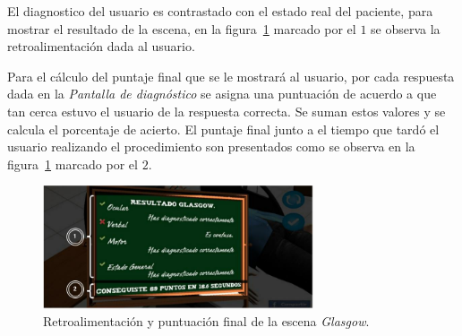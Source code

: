 El diagnostico del usuario es contrastado con el estado real del paciente, para
mostrar el resultado de la escena, en la figura~\ref{fig:glasgow_resultado}
marcado por el $1$ se observa la retroalimentación dada al usuario.

Para el cálculo del puntaje final que se le mostrará al usuario, por cada
respuesta dada en la \emph{Pantalla de diagnóstico} se asigna una puntuación de
acuerdo a que tan cerca estuvo el usuario de la respuesta correcta. Se suman
estos valores y se calcula el porcentaje de acierto. El puntaje final junto a el
tiempo que tardó el usuario realizando el procedimiento son presentados como se
observa en la figura~\ref{fig:glasgow_resultado} marcado por el $2$.

\begin{figure}[H]
\centering
\includegraphics[width=8cm]{../solucion/images/glasgow_resultado.jpg}
\caption{Retroalimentación y puntuación final de la escena \emph{Glasgow}.}
\label{fig:glasgow_resultado}
\end{figure}
